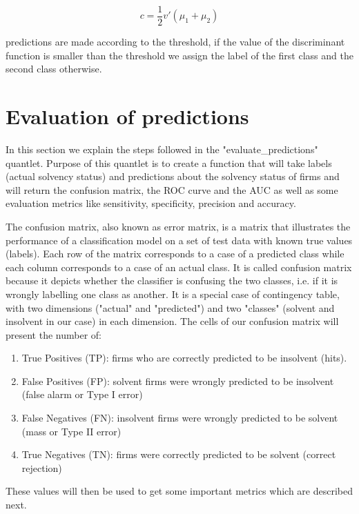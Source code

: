 \documentclass{article}
\begin{document}
\begin{equation}
c = \frac{1}{2} v \prime \left(\mu_1 + \mu_2\right) 
\end{equation}

predictions are made according to the threshold, if the value of the discriminant function is smaller than the threshold we assign the label of the first class and the second class otherwise. 

\section{Evaluation of predictions}

In this section we explain the steps followed in the "evaluate\_predictions" quantlet. Purpose of this quantlet is to create a function that will take labels (actual solvency status) and predictions about the solvency status of firms and will return the confusion matrix, the ROC curve and the AUC as well as some evaluation metrics like sensitivity, specificity, precision and accuracy.

The confusion matrix, also known as error matrix, is a matrix that illustrates the performance of a classification model on a set of test data with known true values (labels). Each row of the matrix corresponds to a case of a predicted class while each column corresponds to a case of an actual class. It is called confusion matrix because it depicts whether the classifier is confusing the two classes, i.e. if it is wrongly labelling one class as another. It is a special case of contingency table, with two dimensions ("actual" and "predicted") and two "classes" (solvent and insolvent in our case) in each dimension. The cells of our confusion matrix will present the number of:

\begin{enumerate}
\item True Positives (TP): firms who are correctly predicted to be insolvent (hits).
\item False Positives (FP): solvent firms were wrongly predicted to be insolvent (false alarm or Type I error)
\item False Negatives (FN): insolvent firms were wrongly predicted to be solvent (mass or Type II error)
\item True Negatives (TN): firms were correctly predicted to be solvent (correct rejection) 
\end{enumerate}

These values will then be used to get some important metrics which are described next.
\end{document}
